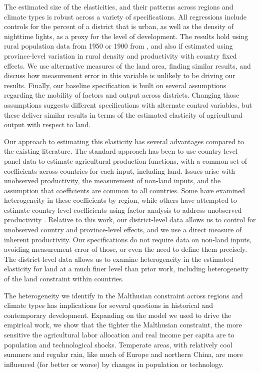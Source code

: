 \documentclass[11pt]{article}
\begin{document}
The estimated size of the elasticities, and their patterns across regions and climate types is robust across a variety of specifications. All regressions include controls for the percent of a district that is urban, as well as the density of nighttime lights, as a proxy for the level of development. The results hold using rural population data from 1950 or 1900 from \cite{hyde31}, and also if estimated using province-level variation in rural density and productivity with country fixed effects. We use alternative measures of the land area, finding similar results, and discuss how measurement error in this variable is unlikely to be driving our results. Finally, our baseline specification is built on several assumptions regarding the mobility of factors and output across districts. Changing those assumptions suggests different specifications with alternate control variables, but these deliver similar results in terms of the estimated elasticity of agricultural output with respect to land.

Our approach to estimating this elasticity has several advantages compared to the existing literature. The standard approach has been to use country-level panel data \citep{Hayami:1970ly,Hayami:1985cr,cpr1997,mm2001,Mundlak:2000dq,mbl2012,et2013mango} to estimate agricultural production functions, with a common set of coefficients across countries for each input, including land. Issues arise with unobserved productivity, the measurement of non-land inputs, and the assumption that coefficients are common to all countries. Some have examined heterogeneity in these coefficients \citep{gg2003,Wiebe2003Resource-Qualit} by region, while others have attempted to estimate country-level coefficients using factor analysis to address unobserved productivity \citep{et2013mango,ev2016clim,ev2016}. Relative to this work, our district-level data allows us to control for unobserved country and province-level effects, and we use a direct measure of inherent productivity. Our specifications do not require data on non-land inputs, avoiding measurement error of those, or even the need to define them precisely. The district-level data allows us to examine heterogeneity in the estimated elasticity for land at a much finer level than prior work, including heterogeneity of the land constraint within countries. 

The heterogeneity we identify in the Malthusian constraint across regions and climate types has implications for several questions in historical and contemporary development. Expanding on the model we used to drive the empirical work, we show that the tighter the Malthusian constraint, the more sensitive the agricultural labor allocation and real income per capita are to population and technological shocks. Temperate areas, with relatively cool summers and regular rain, like much of Europe and northern China, are more influenced (for better or worse) by changes in population or technology.
\end{document}
